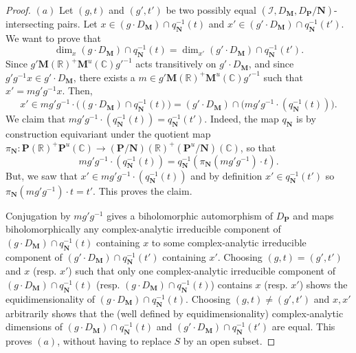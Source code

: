 \documentclass[10pt]{article}
\numberwithin{equation}{subsection}
\theoremstyle{plain}
\theoremstyle{definition}
\theoremstyle{remark}
\newcommand{\I}{\mathscr{I}}
\newcommand{\C}{\mathbb C}
\newcommand{\R}{\mathbb R}
\newcommand{\pp}{\mathbf P}
\newcommand{\M}{\mathbf M}
\newcommand{\NN}{\mathbf N}
\newcommand{\Np}{\mathcal{N}(\pp)}
\begin{document}
\begin{proof}
$(a)$ Let $(g,t)$ and $(g',t')$ be two possibly equal $(\I,D_\M,D_\pp/\NN)$-intersecting pairs. Let $x \in (g\cdot D_\M) \cap q_\NN^{-1}(t)$ and $x' \in (g'\cdot D_\M) \cap q_\NN^{-1}(t')$. We want to prove that
\[
\dim_x (g\cdot D_\M) \cap q_\NN^{-1}(t) = \dim_{x'} (g'\cdot D_\M) \cap q_\NN^{-1}(t').
\]
Since $g' \M(\R)^+\M^u(\C)g'^{-1}$ acts transitively on $g' \cdot D_\M$, and since $g'g^{-1}x \in g' \cdot D_\M$, there exists a $m \in g' \M(\R)^+\M^u(\C)g'^{-1}$ such that $x' = mg'g^{-1}x$. Then,
\[
x' \in mg'g^{-1}\cdot \Big((g \cdot D_\M) \cap q_\NN^{-1}(t)\Big) = (g' \cdot D_\M) \cap \Big(mg'g^{-1}\cdot (q_\NN^{-1}(t))\Big).
\]
We claim that $mg'g^{-1}\cdot (q_\NN^{-1}(t)) = q_\NN^{-1}(t')$. Indeed, the map $q_\NN$ is by construction equivariant under the quotient map $ \pi_\NN : \pp(\R)^+\pp^u(\C) \rightarrow  (\pp/\NN)(\R)^+(\pp^u/\NN)(\C)$, so that
\[mg'g^{-1}\cdot (q_\NN^{-1}(t)) = q_\NN^{-1}(\pi_\NN(mg'g^{-1}) \cdot t).\]
But, we saw that $x' \in mg'g^{-1}\cdot (q_\NN^{-1}(t))$ and by definition $x' \in q_\NN^{-1}(t')$ so $\pi_\NN(mg'g^{-1}) \cdot t = t'$. This proves the claim.

Conjugation by $mg'g^{-1}$ gives a biholomorphic automorphism of $D_\pp$ and maps biholomorphically any complex-analytic irreducible component of $(g\cdot D_\M) \cap q_\NN^{-1}(t)$ containing $x$ to some complex-analytic irreducible component of $(g'\cdot D_\M) \cap q_\NN^{-1}(t')$ containing $x'$. Choosing $(g,t) = (g',t')$ and $x$ (resp. $x'$) such that only one complex-analytic irreducible component of $(g\cdot D_\M) \cap q_\NN^{-1}(t)$ (resp. $(g\cdot D_\M) \cap q_\NN^{-1}(t)$) contains $x$ (resp. $x'$) shows the equidimensionality of $(g\cdot D_\M) \cap q_\NN^{-1}(t)$. Choosing $(g,t) \neq (g',t')$ and $x,x'$ arbitrarily shows that the (well defined by equidimensionality) complex-analytic dimensions of $(g\cdot D_\M) \cap q_\NN^{-1}(t)$ and $(g'\cdot D_\M) \cap q_\NN^{-1}(t')$ are equal. This proves $(a)$, without having to replace $S$ by an open subset.


\end{proof}
\end{document}
